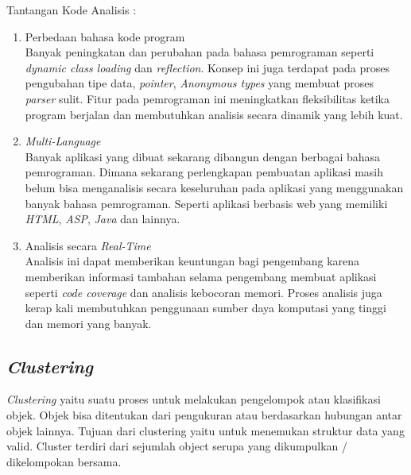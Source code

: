 Tantangan Kode Analisis \cite{9}:
\begin{enumerate}[leftmargin=1.3cm]
	\item Perbedaan bahasa kode program\\
	Banyak peningkatan dan perubahan pada bahasa pemrograman seperti \textit{dynamic class loading} dan \textit{reflection}. Konsep ini juga terdapat pada proses pengubahan tipe data, \textit{pointer}, \textit{Anonymous types} yang membuat proses \textit{parser} sulit. Fitur pada pemrograman ini meningkatkan fleksibilitas ketika program berjalan dan membutuhkan analisis secara dinamik yang lebih kuat.
	\item \textit{Multi-Language}\\
	Banyak aplikasi yang dibuat sekarang dibangun dengan berbagai bahasa pemrograman. Dimana sekarang perlengkapan pembuatan aplikasi masih belum bisa menganalisis secara keseluruhan pada aplikasi yang menggunakan banyak bahasa pemrograman. Seperti aplikasi berbasis web yang memiliki \textit{HTML}, \textit{ASP}, \textit{Java} dan lainnya.
	\item Analisis secara \textit{Real-Time}\\
	Analisis ini dapat memberikan keuntungan bagi pengembang karena memberikan informasi tambahan selama pengembang membuat aplikasi seperti \textit{code coverage} dan analisis kebocoran memori. Proses analisis juga kerap kali membutuhkan penggunaan sumber daya komputasi yang tinggi dan memori yang banyak.\\
\end{enumerate}

\subsection{\textit{Clustering}}
\textit{Clustering} yaitu suatu proses untuk melakukan pengelompok atau klasifikasi objek. Objek bisa ditentukan dari pengukuran atau berdasarkan hubungan antar objek lainnya. Tujuan dari clustering yaitu untuk  menemukan struktur data yang valid. Cluster terdiri dari sejumlah object serupa yang dikumpulkan / dikelompokan bersama.\cite{10}

